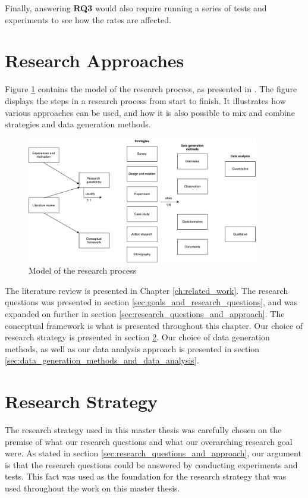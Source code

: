 Finally, answering \textbf{RQ3} would also require running a series of tests and experiments to see how the rates are affected.


\section{Research Approaches}
Figure \ref{fig:model_research_process} contains the model of the research process, as presented in \citep{oates2005researching}. The figure displays the steps in a research process from start to finish. It illustrates how various approaches can be used, and how it is also possible to mix and combine strategies and data generation methods.

\begin{figure}[ht]
    \centering
    \includegraphics[width=0.9\textwidth]{fig/methodology/research_strategies.pdf}
    \caption{Model of the research process}
    \label{fig:model_research_process}
\end{figure}

The literature review is presented in Chapter \ref{ch:related_work}. The research questions was presented in section \ref{sec:goals_and_research_questions}, and was expanded on further in section \ref{sec:research_questions_and_approach}. The conceptual framework is what is presented throughout this chapter. Our choice of research strategy is presented in section \ref{sec:research_strategy}. Our choice of data generation methods, as well as our data analysis approach is presented in section \ref{sec:data_generation_methods_and_data_analysis}.


\section{Research Strategy}
\label{sec:research_strategy}
The research strategy used in this master thesis was carefully chosen on the premise of what our research questions and what our overarching research goal were. As stated in section \ref{sec:research_questions_and_approach}, our argument is that the research questions could be answered by conducting experiments and tests. This fact was used as the foundation for the research strategy that was used throughout the work on this master thesis.


